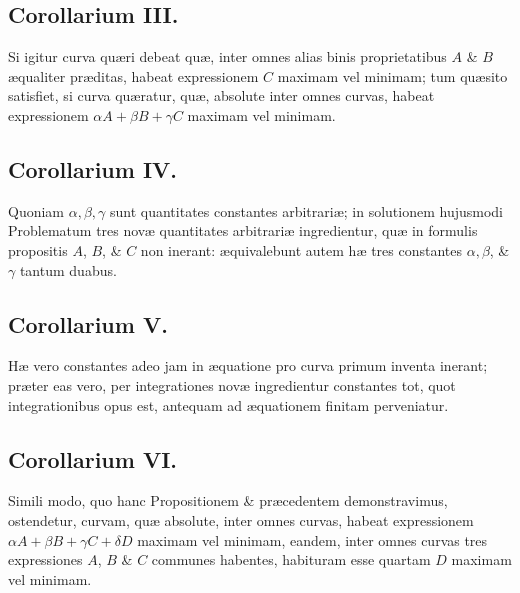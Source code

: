 \subsection*{Corollarium III.}
Si igitur curva quæri debeat quæ, inter omnes alias binis proprietatibus $A$ \& $B$ æqualiter præditas, habeat expressionem $C$ maximam vel minimam; tum quæsito satisfiet, si curva quæratur, quæ, absolute inter omnes curvas, habeat expressionem $\alpha A+\beta B+\gamma C$ maximam vel minimam.
\subsection*{Corollarium IV.}
Quoniam $\alpha,\beta,\gamma$ sunt quantitates constantes arbitrariæ; in solutionem hujusmodi Problematum tres novæ quantitates arbitrariæ ingredientur, quæ in formulis propositis $A$, $B$, \& $C$ non inerant: æquivalebunt autem hæ tres constantes $\alpha,\beta$, \& $\gamma$ tantum duabus.
\subsection*{Corollarium V.}
Hæ vero constantes adeo jam in æquatione pro curva primum inventa inerant; præter eas vero, per integrationes novæ ingredientur constantes tot, quot integrationibus opus est, antequam ad æquationem finitam perveniatur.
\subsection*{Corollarium VI.}
Simili modo, quo hanc Propositionem \& præcedentem demonstravimus, ostendetur, curvam, quæ absolute, inter omnes curvas, habeat expressionem $\alpha A+\beta B+\gamma C+\delta D$ maximam vel minimam, eandem, inter omnes curvas tres expressiones $A$, $B$ \& $C$ communes habentes, habituram esse quartam $D$ maximam vel minimam.

